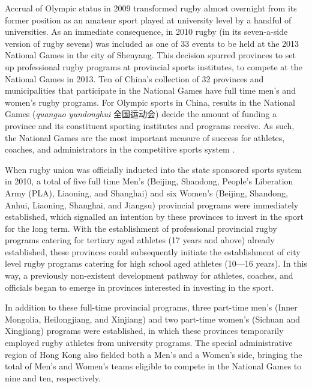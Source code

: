 \begin{CJK}{UTF8}{gbsn}
 Accrual of Olympic status in 2009 transformed rugby almost overnight from its former position as an amateur sport played at university level by a handful of universities.  As an immediate consequence, in 2010 rugby (in its seven-a-side version of rugby sevens) was included as one of 33 events to be held at the 2013 National Games in the city of Shenyang.  This decision spurred provinces to set up professional rugby programs at provincial sports institutes, to compete at the National Games in 2013.  Ten of China's collection of 32 provinces and municipalities that participate in the National Games have full time men's and women's rugby programs.  For Olympic sports in China, results in the National Games (\textit{quanguo yundonghui} 全国运动会) decide the amount of funding a province and its constituent sporting institutes and programs receive.  As such, the National Games are the most important measure of success for athletes, coaches, and administrators in the competitive sports system \citep{Hong2002}.

 When rugby union was officially inducted into the state sponsored sports system in 2010, a total of five full time Men's (Beijing, Shandong, People's Liberation Army (PLA), Liaoning, and Shanghai) and six Women's (Beijing, Shandong, Anhui, Liaoning, Shanghai, and Jiangsu) provincial programs were immediately established, which signalled an intention by these provinces to invest in the sport for the long term.  With the establishment of professional provincial rugby programs catering for tertiary aged athletes (17 years and above) already established, these provinces could subsequently initiate the establishment of city level rugby programs catering for high school aged athletes (10---16 years).  In this way, a previously non-existent development pathway for athletes, coaches, and officials began to emerge in provinces interested in investing in the sport.

 In addition to these full-time provincial programs, three part-time men's (Inner Mongolia, Heilongjiang, and Xinjiang) and two part-time women's (Sichuan and Xingjiang) programs were established, in which these provinces temporarily employed rugby athletes from university programs. The special administrative region of Hong Kong also fielded both a Men's and a Women's side, bringing the total of Men's and Women's teams eligible to compete in the National Games to nine and ten, respectively.


\end{CJK}
